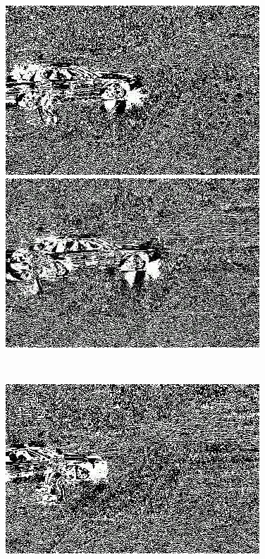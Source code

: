 \documentclass[a4paper]{ctexart}
\begin{document}
\begin{figure}[htbp]
\begin{minipage}[t]{0.2\textwidth}
	\end{minipage}
	\begin{minipage}[t]{0.2\textwidth}
		\centering
		\includegraphics[width=\textwidth]{figure/frames/sb2410.jpg}
	\end{minipage}
	\begin{minipage}[t]{0.2\textwidth}
		\centering
		\includegraphics[width=\textwidth]{figure/frames/sb2415.jpg}
	\end{minipage}\\
	\begin{minipage}[t]{0.2\textwidth}
		\centering
		\includegraphics[width=\textwidth]{figure/frames/sb3400.jpg}

\end{minipage}
\end{figure}
\end{document}
